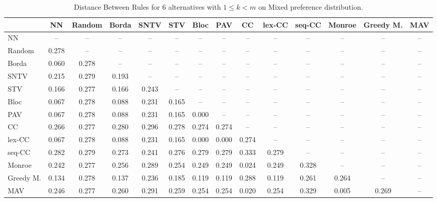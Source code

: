 
\begin{table*}
\centering
\begin{tabular}{lccccccccccccc}
\toprule
 & NN & Random & Borda & SNTV & STV & Bloc & PAV & CC & lex-CC & seq-CC & Monroe & Greedy M. & MAV \\
\midrule
NN & -- & -- & -- & -- & -- & -- & -- & -- & -- & -- & -- & -- & -- \\
Random & 0.278 & -- & -- & -- & -- & -- & -- & -- & -- & -- & -- & -- & -- \\
Borda & 0.060 & 0.278 & -- & -- & -- & -- & -- & -- & -- & -- & -- & -- & -- \\
SNTV & 0.215 & 0.279 & 0.193 & -- & -- & -- & -- & -- & -- & -- & -- & -- & -- \\
STV & 0.166 & 0.277 & 0.166 & 0.243 & -- & -- & -- & -- & -- & -- & -- & -- & -- \\
Bloc & 0.067 & 0.278 & 0.088 & 0.231 & 0.165 & -- & -- & -- & -- & -- & -- & -- & -- \\
PAV & 0.067 & 0.278 & 0.088 & 0.231 & 0.165 & 0.000 & -- & -- & -- & -- & -- & -- & -- \\
CC & 0.266 & 0.277 & 0.280 & 0.296 & 0.278 & 0.274 & 0.274 & -- & -- & -- & -- & -- & -- \\
lex-CC & 0.067 & 0.278 & 0.088 & 0.231 & 0.165 & 0.000 & 0.000 & 0.274 & -- & -- & -- & -- & -- \\
seq-CC & 0.282 & 0.279 & 0.273 & 0.241 & 0.276 & 0.279 & 0.279 & 0.333 & 0.279 & -- & -- & -- & -- \\
Monroe & 0.242 & 0.277 & 0.256 & 0.289 & 0.254 & 0.249 & 0.249 & 0.024 & 0.249 & 0.328 & -- & -- & -- \\
Greedy M. & 0.134 & 0.278 & 0.137 & 0.236 & 0.185 & 0.119 & 0.119 & 0.288 & 0.119 & 0.261 & 0.264 & -- & -- \\
MAV & 0.246 & 0.277 & 0.260 & 0.291 & 0.259 & 0.254 & 0.254 & 0.020 & 0.254 & 0.329 & 0.005 & 0.269 & -- \\
\bottomrule
\end{tabular}

\caption{Distance Between Rules for 6 alternatives with $1 \leq k < m$ on Mixed preference distribution.}
\end{table*}
